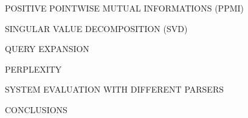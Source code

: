 \begin{frame}{POSITIVE POINTWISE MUTUAL INFORMATIONS (PPMI)}
    
\end{frame}

\begin{frame}{SINGULAR VALUE DECOMPOSITION (SVD)}
    
\end{frame}

\begin{frame}{QUERY EXPANSION}
    
\end{frame}

\begin{frame}{PERPLEXITY}
    
\end{frame}

\begin{frame}{SYSTEM EVALUATION WITH DIFFERENT PARSERS}
    
\end{frame}

\begin{frame}{CONCLUSIONS}
    
\end{frame}







